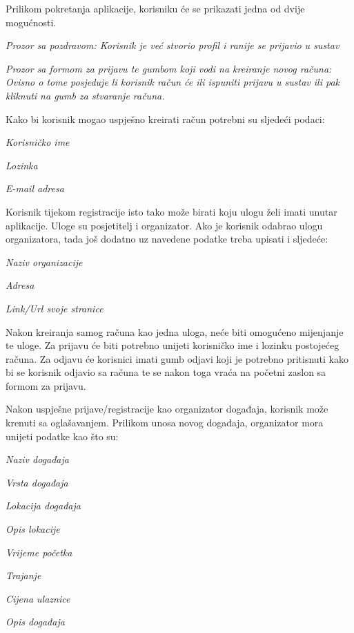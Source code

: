 		Prilikom pokretanja aplikacije, korisniku će se prikazati jedna od dvije mogućnosti. 
		
		\begin{packed_item}
			\item \textit{Prozor sa pozdravom: Korisnik je već stvorio profil i ranije se prijavio u sustav}
			\item \textit{Prozor sa formom za prijavu te gumbom koji vodi na kreiranje novog računa: Ovisno o tome posjeduje li korisnik račun će ili ispuniti prijavu u sustav ili pak kliknuti na gumb za stvaranje računa. }
		\end{packed_item}
		 Kako bi korisnik mogao uspješno kreirati račun potrebni su sljedeći podaci:
		\begin{packed_item}
			\item \textit{Korisničko ime}
			\item \textit{Lozinka}
			\item \textit{E-mail adresa}
		\end{packed_item}
		Korisnik tijekom registracije isto tako može birati koju ulogu želi imati unutar aplikacije. Uloge su posjetitelj i organizator.
		Ako je korisnik odabrao ulogu organizatora, tada još dodatno uz navedene podatke treba upisati i sljedeće:
		\begin{packed_item}
			\item \textit{Naziv organizacije}
			\item \textit{Adresa}
			\item \textit{Link/Url svoje stranice}
		\end{packed_item}
		
		Nakon kreiranja samog računa kao jedna uloga, neće biti omogućeno mijenjanje  te uloge. 
		Za prijavu će biti potrebno unijeti korisničko ime i lozinku postojećeg računa. Za odjavu će korisnici imati gumb odjavi koji je potrebno pritisnuti kako bi se korisnik odjavio sa računa te se nakon toga vraća na početni zaslon sa formom za prijavu.
		
		Nakon uspješne prijave/registracije kao organizator događaja, korisnik može krenuti sa oglašavanjem. Prilikom unosa novog događaja, organizator mora unijeti podatke kao što su: 
		\begin{packed_item}
			\item \textit{Naziv događaja}
			\item \textit{Vrsta događaja}
			\item \textit{Lokacija događaja}
			\item \textit{Opis lokacije}
			\item \textit{Vrijeme početka}
			\item \textit{Trajanje}
			\item \textit{Cijena ulaznice}
			\item \textit{Opis događaja}
		\end{packed_item}
		

